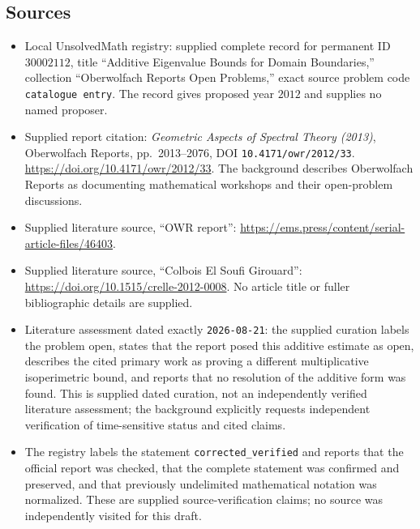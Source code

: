 \documentclass[11pt]{article}
\begin{document}
\subsection{Sources}
\begin{itemize}
\item Local UnsolvedMath registry: supplied complete record for permanent ID \(30002112\), title ``Additive Eigenvalue Bounds for Domain Boundaries,'' collection ``Oberwolfach Reports Open Problems,'' exact source problem code \texttt{catalogue entry}. The record gives proposed year \(2012\) and supplies no named proposer.
\item Supplied report citation: \emph{Geometric Aspects of Spectral Theory (2013)}, Oberwolfach Reports, pp.\ 2013--2076, DOI \texttt{10.4171/owr/2012/33}. \url{https://doi.org/10.4171/owr/2012/33}. The background describes Oberwolfach Reports as documenting mathematical workshops and their open-problem discussions.
\item Supplied literature source, ``OWR report'': \url{https://ems.press/content/serial-article-files/46403}.
\item Supplied literature source, ``Colbois El Soufi Girouard'': \url{https://doi.org/10.1515/crelle-2012-0008}. No article title or fuller bibliographic details are supplied.
\item Literature assessment dated exactly \texttt{2026-08-21}: the supplied curation labels the problem open, states that the report posed this additive estimate as open, describes the cited primary work as proving a different multiplicative isoperimetric bound, and reports that no resolution of the additive form was found. This is supplied dated curation, not an independently verified literature assessment; the background explicitly requests independent verification of time-sensitive status and cited claims.
\item The registry labels the statement \texttt{corrected\_verified} and reports that the official report was checked, that the complete statement was confirmed and preserved, and that previously undelimited mathematical notation was normalized. These are supplied source-verification claims; no source was independently visited for this draft.
\end{itemize}
\end{document}
